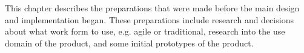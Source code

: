 This chapter describes the preparations that were made before the main design and implementation began. 
These preparations include research and decisions about what work form to use, e.g. agile or traditional, research into the use domain of the product, and some initial prototypes of the product. 